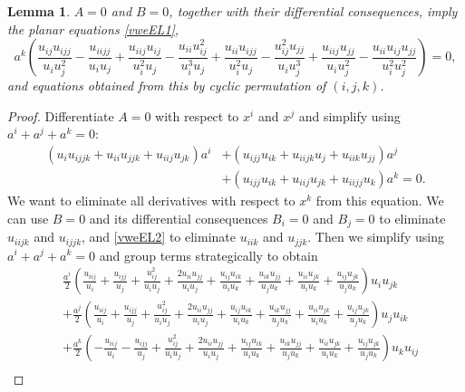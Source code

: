 \documentclass[12pt, a4paper]{article}
\newtheorem{lemma}[theorem]{Lemma}
\theoremstyle{definition}
\begin{document}
\begin{lemma}
	\label{lemma-A2}
	$A = 0$ and $B = 0$, together with their differential consequences, imply the planar equations \eqref{vweEL1},
	\[
	a^{k} {\left(\frac{{u_{ij}} {u_{ijj}}}{{u_{i}} u_{j}^2} - \frac{{u_{iijj}}}{{u_{i}} {u_{j}}} + \frac{{u_{iij}} {u_{ij}}}{u_{i}^2 {u_{j}}} - \frac{{u_{ii}} u_{ij}^2}{u_{i}^3 {u_{j}}} + \frac{{u_{ii}} {u_{ijj}}}{u_{i}^2 {u_{j}}} - \frac{u_{ij}^2 {u_{jj}}}{{u_{i}} u_{j}^3} + \frac{{u_{iij}} {u_{jj}}}{{u_{i}} u_{j}^2} - \frac{{u_{ii}} {u_{ij}} {u_{jj}}}{u_{i}^2 u_{j}^2}\right)} = 0,
	\]
	and equations obtained from this by cyclic permutation of $(i,j,k)$.
\end{lemma}
\begin{proof}
	Differentiate $A= 0$ with respect to $x^i$ and $x^j$ and simplify using $a^i+a^j+a^k=0$:
	\begin{align*}
		{\left({u_{i}} {u_{ijjk}} + {u_{ii}} {u_{jjk}} + {u_{iij}} {u_{jk}}\right)} a^{i}
		&+ {\left({u_{ijj}} {u_{ik}} + {u_{iijk}} {u_{j}} + {u_{iik}} {u_{jj}}\right)} a^j \\
		&+ {\left({u_{ijj}} {u_{ik}} + {u_{iij}} {u_{jk}} + {u_{iijj}} {u_{k}}\right)} a^{k} = 0 .
	\end{align*}
	We want to eliminate all derivatives with respect to $x^k$ from this equation.	
	We can use $B=0$ and its differential consequences $B_i = 0$ and $B_j = 0$ to eliminate $u_{iijk}$ and $u_{ijjk}$, and \eqref{vweEL2} to eliminate $u_{iik}$ and $u_{jjk}$. Then we simplify using $a^i+a^j+a^k = 0$ and group terms strategically to obtain
	\begin{align*}
		&\frac{a^{i}}{2} {\left(\frac{{u_{iij}}}{u_i} + \frac{{u_{ijj}} }{{u_{j}}} + \frac{u_{ij}^2 }{u_i {u_{j}}}  + \frac{2 {u_{ii}} {u_{jj}} }{u_i {u_{j}}} + \frac{{u_{ij}} {u_{ik}} }{u_i {u_{k}}} + \frac{{u_{ik}} {u_{jj}} }{{u_{j}} {u_{k}}} + \frac{{u_{ii}} {u_{jk}}}{u_i {u_{k}}} + \frac{{u_{ij}} {u_{jk}}}{{u_{j}} {u_{k}}}\right)} u_i u_{jk}  \\
		& + \frac{a^j}{2} {\left(\frac{{u_{iij}}}{{u_{i}}} + \frac{u_{ijj}}{u_j} + \frac{u_{ij}^2 }{{u_{i}} u_j} + \frac{2 {u_{ii}} {u_{jj}}}{{u_{i}} u_j} + \frac{{u_{ij}} {u_{ik}}}{{u_{i}} {u_{k}}} + \frac{{u_{ik}} {u_{jj}}}{ u_j {u_{k}}} + \frac{{u_{ii}} {u_{jk}}}{{u_{i}} {u_{k}}} + \frac{{u_{ij}} {u_{jk}}}{ u_j {u_{k}}}\right)} u_j u_{ik}  \\
		&+ \frac{a^{k}}{2} {\left( - \frac{{u_{iij}}}{{u_{i}}} - \frac{{u_{ijj}}}{{u_{j}}} + \frac{u_{ij}^2}{{u_{i}} {u_{j}}} + \frac{2 {u_{ii}} {u_{jj}} }{{u_{i}} {u_{j}}} + \frac{{u_{ij}} {u_{ik}}}{{u_{i}} u_k} + \frac{{u_{ik}} {u_{jj}}}{{u_{j}} u_k} + \frac{{u_{ii}} {u_{jk}}}{{u_{i}} u_k} + \frac{{u_{ij}} {u_{jk}}}{{u_{j}} u_k}\right)} u_k u_{ij}  \\

\end{align*}
\end{proof}
\end{document}
